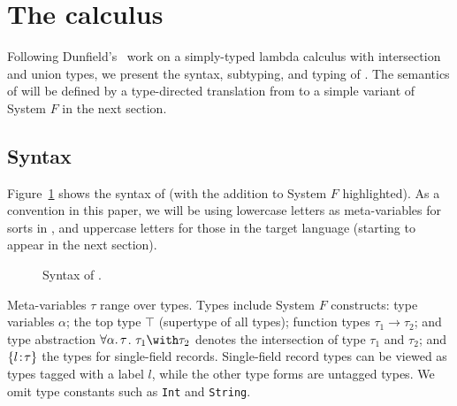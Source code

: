 \section{The \name calculus} \label{sec:fi}


Following Dunfield's~\cite{dunfield2014elaborating} work on a simply-typed
lambda calculus with intersection and union types, we present the syntax,
subtyping, and typing of \name. The semantics of \name will
be defined by a type-directed translation from \name to a simple variant of
System $F$ in the next section.

\subsection{Syntax}

Figure~\ref{fig:fi-syntax} shows the syntax of \name (with the addition to
System $F$ highlighted). As a convention in this paper, we will be using
lowercase letters as meta-variables for sorts in \name, and uppercase letters
for those in the target language (starting to appear in the next section).


\begin{figure}[h]
  
  \caption{Syntax of \name.}
  \label{fig:fi-syntax}
\end{figure}

Meta-variables $\tau$ range over types. Types include System $F$ constructs:
type variables $ \alpha $; the top type $\top$ (supertype of all types); function
types $ \tau_1 \to \tau_2 $; and type abstraction $ \forall \alpha. \, \tau $.
$ \tau_1 \andop \tau_2 $ denotes the intersection of type $ \tau_1 $ and
$ \tau_2 $; and $ \{ l \!:\! \tau \} $ the types for single-field records.
Single-field record types can be viewed as types tagged with a label $l$, while
the other type forms are untagged types. We omit type constants such as
\lstinline$Int$ and \lstinline$String$.

